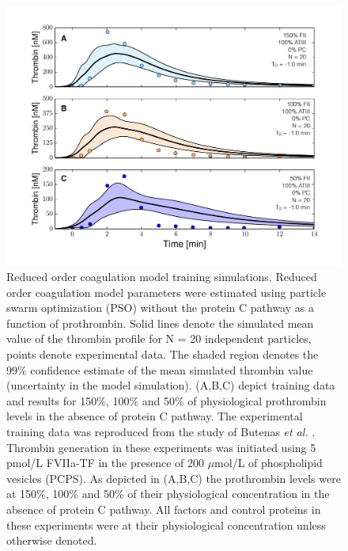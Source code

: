 \documentclass[processes,article,received,moreauthors,pdftex,12pt,a4paper]{mdpi}
\begin{document}
\begin{figure}[H]
\centering
\includegraphics[width=1.0\textwidth]{./figs/Figure-3-DIFF_FII_NO_APC.pdf}
\caption{Reduced order coagulation model training simulations.
Reduced order coagulation model parameters were estimated using particle swarm optimization (PSO) without the protein C pathway as a function of prothrombin. 
Solid lines denote the simulated mean value of the thrombin profile for N = 20 independent particles, points denote experimental data. 
The shaded region denotes the 99\% confidence estimate of the mean simulated thrombin value (uncertainty in the model simulation).
(A,B,C) depict training data and results for 150\%, 100\% and 50\% of physiological prothrombin levels in the absence of protein C pathway.
The experimental training data was reproduced from the study of Butenas \textit{et al.} \citep{Butenas:1999aa}\citep{Veer:1997}.
Thrombin generation in these experiments was initiated using 5 pmol/L FVIIa-TF in the presence of 200 $\mu$mol/L of phospholipid vesicles (PCPS). 
As depicted in (A,B,C) the prothrombin levels were at 150\%, 100\% and 50\% of their physiological concentration in the absence of protein C pathway. 
All factors and control proteins in these experiments were at their physiological concentration unless otherwise denoted.}\label{fig-diff_fII_NO_APC} 
\end{figure}
\end{document}
